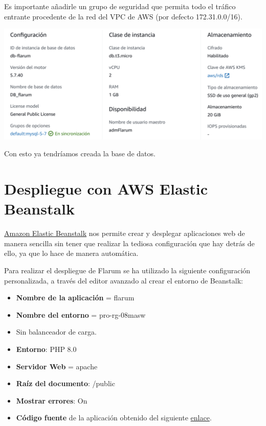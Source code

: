 \documentclass{\ClassPath/viu-tfm-template}
\begin{document}
Es importante añadirle un grupo de seguridad que permita todo el tráfico entrante procedente de la red del VPC de AWS (por defecto 172.31.0.0/16).


\begin{center}
    \includegraphics[frame,width=0.8\linewidth]{img/rds.png}
\end{center}

Con esto ya tendríamos creada la base de datos.


\chapter{Despliegue con AWS Elastic Beanstalk}

\href{https://aws.amazon.com/es/elasticbeanstalk/}{Amazon Elastic Beanstalk} nos permite crear y desplegar aplicaciones web de manera sencilla sin tener que realizar la tediosa configuración que hay detrás de ello, ya que lo hace de manera automática.

Para realizar el despliegue de Flarum se ha utilizado la siguiente configuración personalizada, a través del editor avanzado al crear el entorno de Beanstalk:
\vspace{-15pt}
\begin{itemize}
    \item \textbf{Nombre de la aplicación} = flarum
    \item \textbf{Nombre del entorno} = pro-rg-08masw
    \item Sin balanceador de carga.
    \item \textbf{Entorno}: PHP 8.0
    \item \textbf{Servidor Web} = apache
    \item \textbf{Raíz del documento}: /public
    \item \textbf{Mostrar errores}: On
    \item \textbf{Código fuente} de la aplicación obtenido del siguiente \href{https://amn-viu-resources-public.s3.eu-west-1.amazonaws.com/08masw/actividad2/flarum_php8.0.zip}{enlace}.
\end{itemize}
\end{document}
